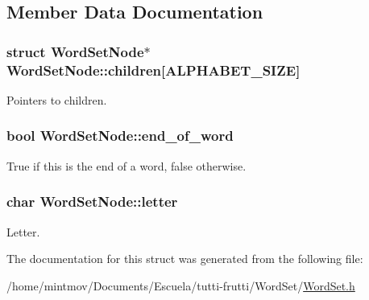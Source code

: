 \subsection{Member Data Documentation}
\hypertarget{structWordSetNode_a885fe017d3ad9e9caaa36bdc453b8f41}{
\subsubsection[{children}]{\setlength{\rightskip}{0pt plus 5cm}struct {\bf Word\-Set\-Node}$\ast$ Word\-Set\-Node\-::children\mbox{[}{\bf A\-L\-P\-H\-A\-B\-E\-T\-\_\-\-S\-I\-Z\-E}\mbox{]}}}\label{structWordSetNode_a885fe017d3ad9e9caaa36bdc453b8f41}
Pointers to children. \hypertarget{structWordSetNode_a53240ee3307a75e6323a7e1eb5c5cd72}{
\subsubsection[{end\-\_\-of\-\_\-word}]{\setlength{\rightskip}{0pt plus 5cm}bool Word\-Set\-Node\-::end\-\_\-of\-\_\-word}}\label{structWordSetNode_a53240ee3307a75e6323a7e1eb5c5cd72}
True if this is the end of a word, false otherwise. \hypertarget{structWordSetNode_a93d70f00579140db7465e4b5208274ef}{
\subsubsection[{letter}]{\setlength{\rightskip}{0pt plus 5cm}char Word\-Set\-Node\-::letter}}\label{structWordSetNode_a93d70f00579140db7465e4b5208274ef}
Letter. 

The documentation for this struct was generated from the following file\-:\begin{DoxyCompactItemize}
\item 
/home/mintmov/\-Documents/\-Escuela/tutti-\/frutti/\-Word\-Set/\hyperlink{WordSet_8h}{Word\-Set.\-h}\end{DoxyCompactItemize}
